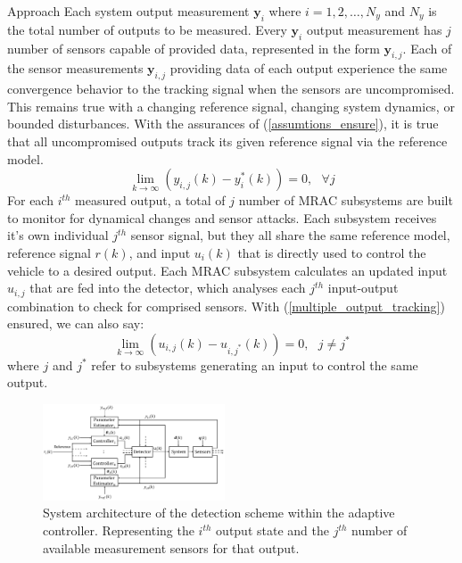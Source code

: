\begin{section}{Approach}
Each system output measurement $\bm{y}_i$ where $i=1,2,\dots,N_y$ and $N_y$ is the total number of outputs to be measured. Every $\bm{y}_i$ output measurement has $j$ number of sensors capable of provided data, represented in the form $\bm{y}_{i,j}$. Each of the sensor measurements $\bm{y}_{i,j}$ providing data of each output experience the same convergence behavior to the tracking signal when the sensors are uncompromised. This remains true with a changing reference signal, changing system dynamics, or bounded disturbances. 
With the assurances of (\ref{assumtions_ensure}), it is true that all uncompromised outputs track its given reference signal via the reference model.
\begin{equation}
\label{multiple_output_tracking}
    \lim_{k\to\infty}(y_{i,j}(k)-y^*_i(k))=0, \text{ }\forall j
\end{equation}
For each $i^{th}$ measured output, a total of $j$ number of MRAC subsystems are built to monitor for dynamical changes and sensor attacks. Each subsystem receives it's own individual $j^{th}$ sensor signal, but they all share the same reference model, reference signal $r(k)$, and input $u_i(k)$ that is directly used to control the vehicle to a desired output. Each MRAC subsystem calculates an updated input $u_{i,j}$ that are fed into the detector, which analyses each $j^{th}$ input-output combination to check for comprised sensors. With (\ref{multiple_output_tracking}) ensured, we can also say:
\begin{equation}
    \lim_{k\to\infty}(u_{i,j}(k)-u_{i,j^*}(k))=0, \text{ }j\neq j^*
\end{equation}
where $j$ and $j^*$ refer to subsystems generating an input to control the same output.


\begin{figure}[ht!]
\vspace{1pt}
\centering
\includegraphics[width=0.48\textwidth]{con_and_det.png}
\caption{System architecture of the detection scheme within the adaptive controller. Representing the $i^{th}$ output state and the $j^{th}$ number of available measurement sensors for that output.}
\label{fig:det_arch}
\end{figure}


\end{section}
